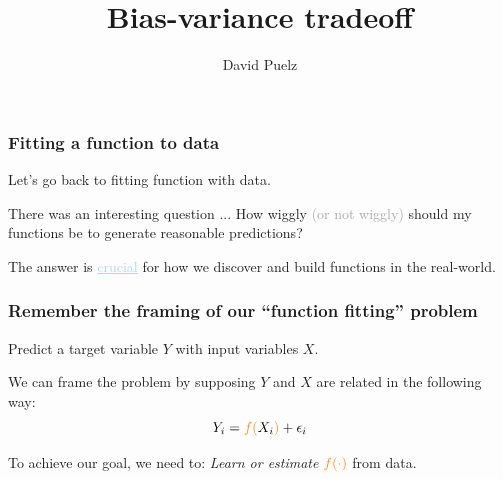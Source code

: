 \documentclass{beamer}
\title[]{\Large{Bias-variance tradeoff} \vspace{5mm}}
\author{David Puelz \\ \dg{\small The University of Austin}}
\institute[] %
{

}
\date{} %
\newcommand{\bo}[1]{\textcolor{burntorange}{#1}}
\newcommand{\lb}[1]{\textcolor{lightblue}{#1}}
\newcommand{\dg}[1]{\textcolor{darkgray}{#1}}
\newcommand{\sk}{\vspace{.5cm}}
\newcommand{\skoo}{\vspace{.2in}}
\newcommand{\skooo}{\vspace{.3in}}
\begin{document}
{
\begin{frame}[noframenumbering]
\vspace{12mm}
\vspace{5mm}
\titlepage %
\end{frame}
}







\begin{frame}[plain]
\frametitle{Fitting a function to data}


Let's go back to fitting function with data. \\  \sk\sk

There was an interesting question ... \bo{How wiggly \dg{(or not wiggly)} should my functions be to generate reasonable predictions?} \\ \sk\sk

The answer is \lb{\underline{crucial}} for how we discover and build functions in the real-world.

 

\end{frame}




\begin{frame}[plain]
\frametitle{Remember the framing of our ``function fitting'' problem}
Predict a \bo{target variable $Y$} with \bo{input variables $X$}.\skooo 


\pause
\skoo

We can frame the problem by supposing $Y$ and $X$ are related in the following way:
$$
Y_i = \bo{f(}X_i\bo{)} + \epsilon_i
$$

\skoo
{To achieve our goal, we need to: {\it Learn or estimate} $\bo{f(\cdot)}$ from data. }


\end{frame}
\end{document}
